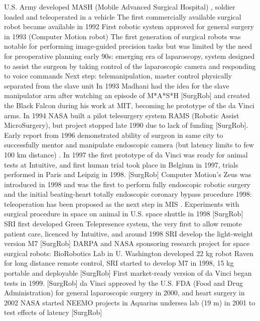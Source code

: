 U.S. Army developed MASH (Mobile Advanced Surgical Hospital) \citep{bib:brown_univ}, soldier loaded and teleoperated in a vehicle
The first commercially available surgical robot became available in 1992\citep{bib:telesurg_history}
First robotic system approved for general surgery in 1993 (Computer Motion robot) \citep{bib:telesurg_history}
The first generation of surgical robots was notable for performing image-guided precision tasks but was limited by the need for preoperative planning
early 90s: emerging era of laparoscopy, system designed to assist the surgeon by taking control of the laparoscopic camera and responding to voice commands
Next step: telemanipulation, master control physically separated from the slave unit
In 1993 Madhani had the idea for the slave manipulator arm after watching an episode of M*A*S*H [SurgRob] and created the Black Falcon during his work at MIT, becoming he prototype of the da Vinci arms.
In 1994 NASA built a pilot telesurgery system RAMS (Robotic Assist MicroSurgery), but project stopped late 1990 due to lack of funding [SurgRob].
Early report from 1996 demonstrated ability of surgeon in same city to successfully mentor and manipulate endoscopic camera (but latency limits to few 100 km distance) \citep{bib:telesurg_history}.
In 1997 the first prototype of da Vinci was ready for animal tests at Intuitive, and first human trial took place in Belgium in 1997, trials performed in Paris and Leipzig in 1998. [SurgRob]
Computer Motion's Zeus was introduced in 1998 and was the first to perform fully endoscopic robotic surgery and the initial beating-heart totally endoscopic coronary bypass procedure \citep{bib:brown_univ}
1998: teleoperation has been proposed as the next step in MIS \citep{bib:black_falcon}.
Experiments with surgical procedure in space on animal in U.S. space shuttle in 1998 [SurgRob]
SRI first developed Green Telepresence system, the very first to allow remote patient care, licenced by Intuitive, and around 1998 SRI develop the light-weight version M7 [SurgRob]
DARPA and NASA sponsoring research project for space surgical robots: BioRobotics Lab in U. Washington developed 22 kg robot Raven for long distance remote control, SRI started to develop M7 in 1998, 15 kg portable and deployable [SurgRob]
First market-ready version of da Vinci began tests in 1999. [SurgRob]
da Vinci approved by the U.S. FDA (Food and Drug Administration) for general laparoscopic surgery in 2000, and heart surgery in 2002 \citep{bib:brown_univ}
NASA started NEEMO projects in Aquarius undersea lab (19 m) in 2001 to test effects of latency [SurgRob]
